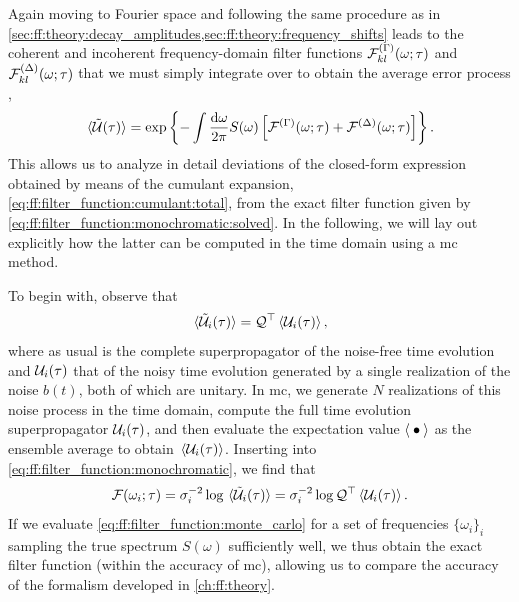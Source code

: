Again moving to Fourier space and following the same procedure as in \cref{sec:ff:theory:decay_amplitudes,sec:ff:theory:frequency_shifts} leads to the coherent and incoherent frequency-domain filter functions $\mathcal{F}^{(\Gamma)}_{kl}(\omega;\tau)$ and $\mathcal{F}^{(\Delta)}_{kl}(\omega;\tau)$ that we must simply integrate over to obtain the average error process \liouvUetavg,
\begin{equation}\label{eq:ff:filter_function:cumulant:total}
    \liouvUetavg = \exp\left\lbrace -\int\ddf{\omega}S(\omega)\left[\FF\gth{\decayamps}(\omega;\tau) + \FF\gth{\freqshifts}(\omega;\tau)\right]\right\rbrace.
\end{equation}
This allows us to analyze in detail deviations of the closed-form expression obtained by means of the cumulant expansion, \cref{eq:ff:filter_function:cumulant:total}, from the exact filter function given by \cref{eq:ff:filter_function:monochromatic:solved}.
In the following, we will lay out explicitly how the latter can be computed in the time domain using a \gls{mc} method.

To begin with, observe that
\begin{align}
    \expval*{\mathcal{\tilde{U}}_i(\tau)} = \mathcal{Q}^\top \expval*{\mathcal{U}_i(\tau)},
\end{align}
where as usual \liouvQ is the complete superpropagator of the noise-free time evolution and $\mathcal{U}_i(\tau)$ that of the noisy time evolution generated by a single realization of the noise $b(t)$, both of which are unitary.
In \gls{mc}, we generate $N$ realizations of this noise process in the time domain, compute the full time evolution superpropagator $\mathcal{U}_i(\tau)$, and then evaluate the expectation value $\expval{\:\bullet\:}$ as the ensemble average to obtain $\ev*{\liouvU_i(\tau)}$.
Inserting into \cref{eq:ff:filter_function:monochromatic}, we find that
\begin{equation}\label{eq:ff:filter_function:monte_carlo}
    \mc{F}(\omega_i; \tau) = \sigma_i^{-2}\log\expval*{\liouvUe_i(\tau)} = \sigma_i^{-2}\log\liouvQ\transpose\expval{\liouvU_i(\tau)}.
\end{equation}
If we evaluate \cref{eq:ff:filter_function:monte_carlo} for a set of frequencies $\lbrace\omega_i\rbrace_i$ sampling the true spectrum $S(\omega)$ sufficiently well, we thus obtain the exact filter function \FFot (within the accuracy of \gls{mc}), allowing us to compare the accuracy of the formalism developed in \cref{ch:ff:theory}.

